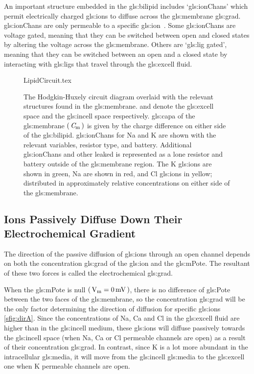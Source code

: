 \documentclass[class={myRUCProject}, crop=false]{standalone}
\begin{document}
An important structure embedded in the \gls{gls:bilipid} includes `\glspl{gls:ionChan}' which permit electrically charged \glspl{gls:ion} to diffuse across the \gls{gls:membrane} \gls{gls:grad}. \Glspl{gls:ionChan} are only permeable to a specific \gls{gls:ion}~\cite{}. Some \glspl{gls:ionChan} are voltage gated, meaning that they can be switched between open and closed states by altering the voltage across the \gls{gls:membrane}. 
Others are `\gls{gls:lig} gated', meaning that they can be switched between an open and a closed state by interacting with \glspl{gls:lig} that travel through the \gls{gls:excell} fluid. 

\vspace{1em}

\begin{figure}[H]
  \centering
  {LipidCircuit.tex}
  \caption{The Hodgkin-Huxely circuit diagram overlaid with the relevant structures found in the \gls{gls:membrane}.  and  denote the \gls{gls:excell} space and the \gls{gls:incell} space respectively. \Gls{gls:capa} of the \gls{gls:membrane} \(\left(\,\mathit{C}_\mathrm{m}\,\right)\) is given by the charge difference on either side of the \gls{gls:bilipid}. \Glspl{gls:ionChan} for \gls{Na} and \gls{K} are shown with the relevant variables, resistor type, and battery. Additional \glspl{gls:ionChan} and other leaked is represented as a lone resistor and battery outside of the \gls{gls:membrane} region. The \gls{K} \glspl{gls:ion} are shown in green, \gls{Na} are shown in red, and \gls{Cl} \glspl{gls:ion} in yellow; distributed in approximately relative concentrations on either side of the \gls{gls:membrane}. }\label{fig:MembraneCircut}
\end{figure}


\subsection{Ions Passively Diffuse Down Their Electrochemical Gradient}
The direction of the passive diffusion of \glspl{gls:ion} through an open channel depends on both the concentration \gls{gls:grad} of the \gls{gls:ion} and the \gls{gls:mPote}. The resultant of these two forces is called the electrochemical \gls{gls:grad}.

When the \gls{gls:mPote} is null \(\br{\unit{\V\membrane}=\qty{0}{\mV}}\), there is no difference of \gls{gls:Pote} between the two faces of the \gls{gls:membrane}, so the concentration \gls{gls:grad} will be the only factor determining the direction of diffusion for specific \glspl{gls:ion} \cref{sfig:dirA}. Since the concentrations of \gls{Na}, \gls{Ca} and \gls{Cl} in the \gls{gls:excell} fluid are higher than in the \gls{gls:incell} medium, these \glspl{gls:ion} will diffuse passively towards the \gls{gls:incell} space (when \gls{Na}, \gls{Ca} or \gls{Cl} permeable channels are open) as a result of their concentration \gls{gls:grad}. In contrast, since \gls{K} is a lot more abundant in the intracellular \gls{gls:media}, it will move from the \gls{gls:incell} \gls{gls:media} to the \gls{gls:excell} one when \gls{K} permeable channels are open. 
\end{document}
